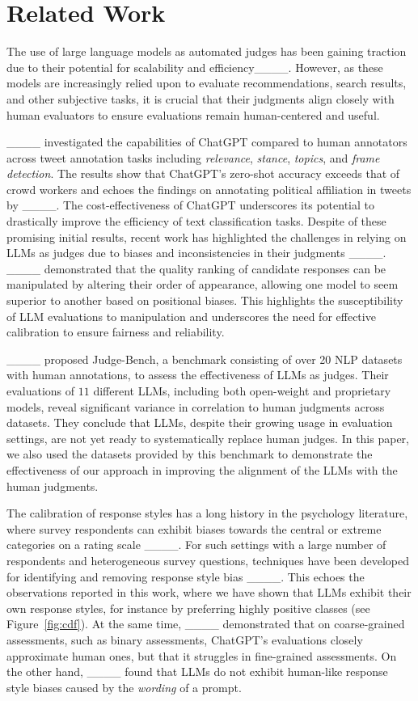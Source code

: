\section{Related Work}
\label{sec:literature_review}
The use of large language models as automated judges has been gaining traction due to their potential for scalability and efficiency____. However, as these models are increasingly relied upon to evaluate recommendations, search results, and other subjective tasks, it is crucial that their judgments align closely with human evaluators to ensure evaluations remain human-centered and useful.

____ investigated the capabilities of ChatGPT compared to human annotators across tweet annotation tasks including \textit{relevance}, \textit{stance}, \textit{topics}, and \textit{frame detection}. The results show that ChatGPT's zero-shot accuracy exceeds that of crowd workers and echoes the findings on annotating political affiliation in tweets by ____.
%
The cost-effectiveness of ChatGPT underscores its potential to drastically improve the efficiency of text classification tasks. 
%
Despite of these promising initial results, recent work has highlighted the challenges in relying on LLMs as judges due to biases and inconsistencies in their judgments ____. ____ demonstrated that the quality ranking of candidate responses can be manipulated by altering their order of appearance, allowing one model to seem superior to another based on positional biases. This highlights the susceptibility of LLM evaluations to manipulation and underscores the need for effective calibration to ensure fairness and reliability.

____ proposed Judge-Bench, a benchmark consisting of over 20 NLP datasets with human annotations, to assess the effectiveness of LLMs as judges. Their evaluations of $11$ different LLMs, including both open-weight and proprietary models, reveal significant variance in correlation to human judgments across datasets. They conclude that LLMs, despite their growing usage in evaluation settings, are not yet ready to systematically replace human judges.
%
In this paper, we also used the datasets provided by this benchmark to demonstrate the effectiveness of our approach in improving the alignment of the LLMs with the human judgments. 

The calibration of response styles has a long history in the psychology literature, where survey respondents can exhibit biases towards the central or extreme categories on a rating scale ____. For such settings with a large number of respondents and heterogeneous survey questions, techniques have been developed for identifying and removing response style bias ____. This echoes the observations reported in this work, where we have shown that LLMs exhibit their own response styles, for instance by preferring highly positive classes (see Figure~\ref{fig:cdf}). At the same time, ____ demonstrated that on coarse-grained assessments, such as binary assessments, ChatGPT’s evaluations
closely approximate human ones, but that it struggles in fine-grained assessments. On the other hand, ____ found that LLMs do not exhibit human-like response style biases caused by the \emph{wording} of a prompt. 

